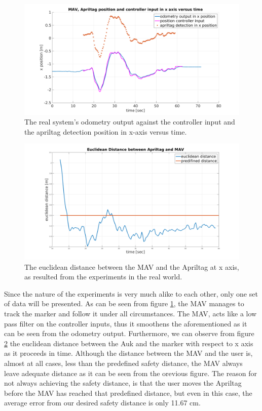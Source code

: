 \begin{figure}
	\centering
	 \includegraphics[width=1.00\textwidth]{images/real_MAV_odom_controller_bag3.pdf}
	 \caption{The real system's odometry output against the controller input and the apriltag detection position in x-axis versus time.}
	 \label{pics:realOdomControlDetection}
\end{figure}

\begin{figure}
	\centering
	 \includegraphics[width=1.00\textwidth]{images/real_euclidean_distance.pdf}
	 \caption{The euclidean distance between the MAV and the Apriltag at x axis, as resulted from the experiments in the real world.}
	 \label{pics:euclideanDistance}
\end{figure}

Since the nature of the experiments is very much alike to each other, only one set of data will be presented. As can be seen from figure \ref{pics:realOdomControlDetection}, the MAV manages to track the marker and follow it under all circumstances. The MAV, acts like a low pass filter on the controller inputs, thus it smoothens the aforementioned as it can be seen from the odometry output. Furthermore, we can observe from figure \ref{pics:euclideanDistance} the euclidean distance between the Auk and the marker with respect to x axis as it proceeds in time. Although the distance between the MAV and the user is, almost at all cases, less than the predefined safety distance, the MAV always leave adequate distance as it can be seen from the orevious figure. The reason for not always achieving the safety distance, is that the user moves the Apriltag before the MAV has reached that predefined distance, but even in this case, the average error from our desired safety distance is only 11.67 cm.   


